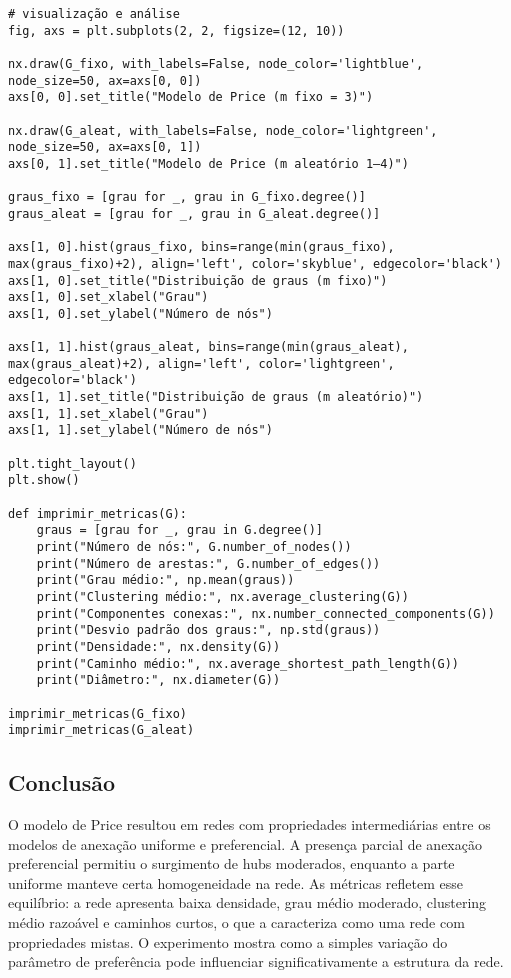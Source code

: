 \documentclass{article}
\begin{document}
\begin{verbatim}
# visualização e análise
fig, axs = plt.subplots(2, 2, figsize=(12, 10))

nx.draw(G_fixo, with_labels=False, node_color='lightblue', node_size=50, ax=axs[0, 0])
axs[0, 0].set_title("Modelo de Price (m fixo = 3)")

nx.draw(G_aleat, with_labels=False, node_color='lightgreen', node_size=50, ax=axs[0, 1])
axs[0, 1].set_title("Modelo de Price (m aleatório 1–4)")

graus_fixo = [grau for _, grau in G_fixo.degree()]
graus_aleat = [grau for _, grau in G_aleat.degree()]

axs[1, 0].hist(graus_fixo, bins=range(min(graus_fixo), max(graus_fixo)+2), align='left', color='skyblue', edgecolor='black')
axs[1, 0].set_title("Distribuição de graus (m fixo)")
axs[1, 0].set_xlabel("Grau")
axs[1, 0].set_ylabel("Número de nós")

axs[1, 1].hist(graus_aleat, bins=range(min(graus_aleat), max(graus_aleat)+2), align='left', color='lightgreen', edgecolor='black')
axs[1, 1].set_title("Distribuição de graus (m aleatório)")
axs[1, 1].set_xlabel("Grau")
axs[1, 1].set_ylabel("Número de nós")

plt.tight_layout()
plt.show()

def imprimir_metricas(G):
    graus = [grau for _, grau in G.degree()]
    print("Número de nós:", G.number_of_nodes())
    print("Número de arestas:", G.number_of_edges())
    print("Grau médio:", np.mean(graus))
    print("Clustering médio:", nx.average_clustering(G))
    print("Componentes conexas:", nx.number_connected_components(G))
    print("Desvio padrão dos graus:", np.std(graus))
    print("Densidade:", nx.density(G))
    print("Caminho médio:", nx.average_shortest_path_length(G))
    print("Diâmetro:", nx.diameter(G))

imprimir_metricas(G_fixo)
imprimir_metricas(G_aleat)

\end{verbatim}

\subsection*{Conclusão}

O modelo de Price resultou em redes com propriedades intermediárias entre os modelos de anexação uniforme e preferencial. A presença parcial de anexação preferencial permitiu o surgimento de hubs moderados, enquanto a parte uniforme manteve certa homogeneidade na rede. As métricas refletem esse equilíbrio: a rede apresenta baixa densidade, grau médio moderado, clustering médio razoável e caminhos curtos, o que a caracteriza como uma rede com propriedades mistas. O experimento mostra como a simples variação do parâmetro de preferência pode influenciar significativamente a estrutura da rede.
\end{document}
